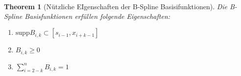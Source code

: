 \documentclass[10pt,a4paper]{article}
\newtheorem{theorem}{Theorem}
\begin{document}
	\begin{theorem}[Nützliche EIgenschaften der B-Spline Basisifunktionen]
		Die B-Spline Basisfunktionen erfüllen folgende Eigenschaften:
		\begin{enumerate}
			\item $\text{supp} B_{i, k} \subset [s_{i-1}, x_{i+k-1}]$
			\item $B_{i, k} \geq 0$
			\item $\sum_{i=2-k}^n B_{i, k} = 1$
		\end{enumerate}
	\end{theorem}
\end{document}
